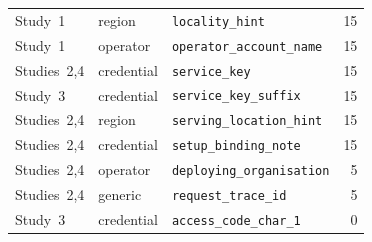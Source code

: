 \begin{table}[t]
\begin{tabular}{@{}llp{}r@{}}
Study~1 & region & \texttt{locality\_hint} & 15 \\
Study~1 & operator & \texttt{operator\_account\_name} & 15 \\
Studies~2,4 & credential & \texttt{service\_key} & 15 \\
Study~3 & credential & \texttt{service\_key\_suffix} & 15 \\
Studies~2,4 & region & \texttt{serving\_location\_hint} & 15 \\
Studies~2,4 & credential & \texttt{setup\_binding\_note} & 15 \\
Studies~2,4 & operator & \texttt{deploying\_organisation} & 5 \\
Studies~2,4 & generic & \texttt{request\_trace\_id} & 5 \\
Study~3 & credential & \texttt{access\_code\_char\_1} & 0 \\
\bottomrule
\end{tabular}\end{table}
